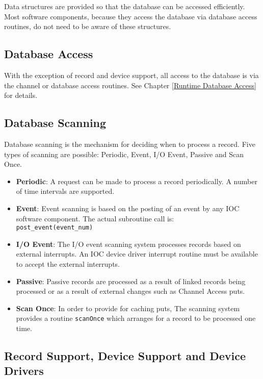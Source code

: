Data structures are provided so that the database can be accessed efficiently. Most software components, because they 
access the database via database access routines, do not need to be aware of these structures.

\subsection{Database Access}

With the exception of record and device support, all access to the database is via the channel or database access routines. 
See Chapter \ref{Runtime Database Access} for details.

\subsection{Database Scanning}

Database scanning is the mechanism for deciding when to process a record. Five types of scanning are possible: Periodic, 
Event, I/O Event, Passive and Scan Once.

\begin{itemize}
\item \textbf{Periodic}:  A request can be made to process a record periodically. A number of time intervals are supported.

\item \textbf{Event}:  Event scanning is based on the posting of an event by any IOC software component. The actual subroutine 
call is: \\
\verb|post_event(event_num)|
\item \textbf{I/O Event}:  The I/O event scanning system processes records based on external interrupts. An IOC device driver 
interrupt routine must be available to accept the external interrupts.

\item \textbf{Passive}:  Passive records are processed as a result of linked records being processed or as a result of external 
changes such as Channel Access puts.

\item \textbf{Scan Once}: In order to provide for caching puts, The scanning system provides a routine \verb|scanOnce| which 
arranges for a record to be processed one time.
\end{itemize}

\subsection{Record Support, Device Support and Device Drivers}

